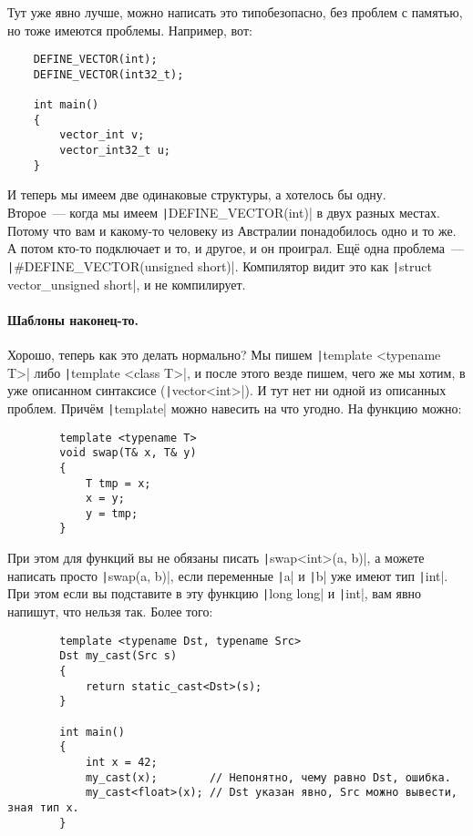 \documentclass{article}
\begin{document}
    Тут уже явно лучше, можно написать это типобезопасно, без проблем с памятью, но тоже имеются проблемы. Например, вот:
    \begin{verbatim}
    DEFINE_VECTOR(int);
    DEFINE_VECTOR(int32_t);

    int main()
    {
        vector_int v;
        vector_int32_t u;
    }
    \end{verbatim}
    И теперь мы имеем две одинаковые структуры, а хотелось бы одну.\\
    Второе~--- когда мы имеем \texttt|DEFINE_VECTOR(int)| в двух разных местах. Потому что вам и какому-то человеку из Австралии понадобилось одно и то же. А потом кто-то подключает и то, и другое, и он проиграл. Ещё одна проблема~--- \texttt|#DEFINE_VECTOR(unsigned short)|. Компилятор видит это как \texttt|struct vector_unsigned short|, и не компилирует.
    \paragraph{Шаблоны наконец-то.}
    Хорошо, теперь как это делать нормально? Мы пишем \texttt|template <typename T>| либо \texttt|template <class T>|, и после этого везде пишем, чего же мы хотим, в уже описанном синтаксисе (\texttt|vector<int>|). И тут нет ни одной из описанных проблем. Причём \texttt|template| можно навесить на что угодно. На функцию можно:
    \begin{verbatim}
        template <typename T>
        void swap(T& x, T& y)
        {
            T tmp = x;
            x = y;
            y = tmp;
        }
    \end{verbatim}
    При этом для функций вы не обязаны писать \texttt|swap<int>(a, b)|, а можете написать просто \texttt|swap(a, b)|, если переменные \texttt|a| и \texttt|b| уже имеют тип \texttt|int|. При этом если вы подставите в эту функцию \texttt|long long| и \texttt|int|, вам явно напишут, что нельзя так. Более того:
    \begin{verbatim}
        template <typename Dst, typename Src>
        Dst my_cast(Src s)
        {
            return static_cast<Dst>(s);
        }

        int main()
        {
            int x = 42;
            my_cast(x);        // Непонятно, чему равно Dst, ошибка.
            my_cast<float>(x); // Dst указан явно, Src можно вывести, зная тип x.
        }
    \end{verbatim}
\end{document}
